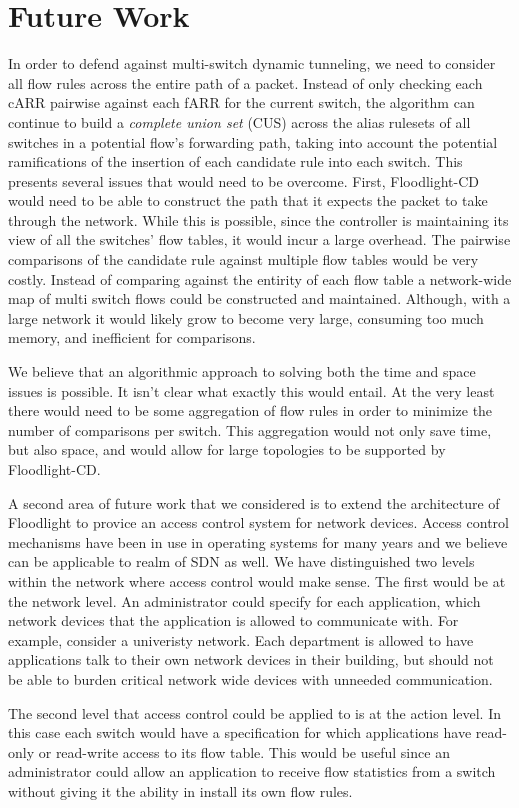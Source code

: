 \section{Future Work}
\label{sec:future}

In order to defend against multi-switch dynamic tunneling, we need to consider all flow rules across the entire path of a packet.
Instead of only checking each cARR pairwise against each fARR for the current switch, the algorithm can continue to build a \emph{complete union set} (CUS) across the alias rulesets of all switches in a potential flow's forwarding path, taking into account the potential ramifications of the insertion of each candidate rule into each switch. 
This presents several issues that would need to be overcome.
First, Floodlight-CD would need to be able to construct the path that it expects the packet to take through the network.
While this is possible, since the controller is maintaining its view of all the switches' flow tables, it would incur a large overhead.
The pairwise comparisons of the candidate rule against multiple flow tables would be very costly. 
Instead of comparing against the entirity of each flow table a network-wide map of multi switch flows could be constructed and maintained.
Although, with a large network it would likely grow to become very large, consuming too much memory, and inefficient for comparisons.

We believe that an algorithmic approach to solving both the time and space issues is possible.
It isn't clear what exactly this would entail.
At the very least there would need to be some aggregation of flow rules in order to minimize the number of comparisons per switch.
This aggregation would not only save time, but also space, and would allow for large topologies to be supported by Floodlight-CD.

A second area of future work that we considered is to extend the architecture of Floodlight to provice an access control system for network devices.
Access control mechanisms have been in use in operating systems for many years and we believe can be applicable to realm of SDN as well.
We have distinguished two levels within the network where access control would make sense.
The first would be at the network level.
An administrator could specify for each application, which network devices that the application is allowed to communicate with.
For example, consider a univeristy network.
Each department is allowed to have applications talk to their own network devices in their building, but should not be able to burden critical network wide devices with unneeded communication.

The second level that access control could be applied to is at the action level.
In this case each switch would have a specification for which applications have read-only or read-write access to its flow table.
This would be useful since an administrator could allow an application to receive flow statistics from a switch without giving it the ability in install its own flow rules.

